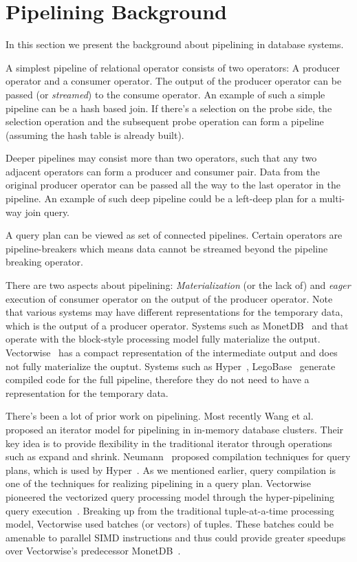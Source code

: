 \section{Pipelining Background}\label{sec:pipe-background}
In this section we present the background about pipelining in database systems. 

A simplest pipeline of relational operator consists of two operators: A producer operator and a consumer operator. 
The output of the producer operator can be passed (or \textit{streamed}) to the consume operator. 
An example of such a simple pipeline can be a hash based join. 
If there's a selection on the probe side, the selection operation and the subsequent probe operation can form a pipeline (assuming the hash table is already built).

Deeper pipelines may consist more than two operators, such that any two adjacent operators can form a producer and consumer pair.
Data from the original producer operator can be passed all the way to the last operator in the pipeline. 
An example of such deep pipeline could be a left-deep plan for a multi-way join query.

A query plan can be viewed as set of connected pipelines. 
Certain operators are pipeline-breakers which means data cannot be streamed beyond the pipeline breaking operator. 

There are two aspects about pipelining: \textit{Materialization} (or the lack of) and \textit{eager} execution of consumer operator on the output of the producer operator. 
Note that various systems may have different representations for the temporary data, which is the output of a producer operator. 
Systems such as MonetDB~\cite{monetdb} and \sys{} that operate with the block-style processing model fully materialize the output. 
Vectorwise~\cite{vectorwise} has a compact representation of the intermediate output and does not fully materialize the ouptut.
Systems such as Hyper~\cite{hyper}, LegoBase~\cite{legobase} generate compiled code for the full pipeline, therefore they do not need to have a representation for the temporary data.

There's been a lot of prior work on pipelining.
Most recently Wang et al.~\cite{wang2016elastic} proposed an iterator model for pipelining in in-memory database clusters.
Their key idea is to provide flexibility in the traditional iterator through operations such as expand and shrink.
Neumann~\cite{DBLP:journals/pvldb/Neumann11} proposed compilation techniques for query plans, which is used by Hyper~\cite{hyper, morsel}. 
As we mentioned earlier, query compilation is one of the techniques for realizing pipelining in a query plan. 
Vectorwise~\cite{vectorwise} pioneered the vectorized query processing model through the hyper-pipelining query execution~\cite{BonczZN05}.
Breaking up from the traditional tuple-at-a-time processing model, Vectorwise used batches (or vectors) of tuples. 
These batches could be amenable to parallel SIMD instructions and thus could provide greater speedups over Vectorwise's predecessor MonetDB~\cite{monetdb}.

